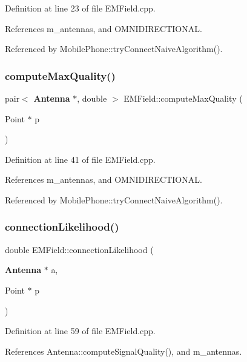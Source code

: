Definition at line 23 of file E\+M\+Field.\+cpp.



References m\+\_\+antennas, and O\+M\+N\+I\+D\+I\+R\+E\+C\+T\+I\+O\+N\+AL.



Referenced by Mobile\+Phone\+::try\+Connect\+Naive\+Algorithm().

\mbox{\label{class_e_m_field_ae51a157793b6d59c314b14f3c0b1795c}} 
\subsubsection{compute\+Max\+Quality()}
{\footnotesize\ttfamily pair$<$ \textbf{ Antenna} $\ast$, double $>$ E\+M\+Field\+::compute\+Max\+Quality (\begin{DoxyParamCaption}\item[{Point $\ast$}]{p }\end{DoxyParamCaption})}



Definition at line 41 of file E\+M\+Field.\+cpp.



References m\+\_\+antennas, and O\+M\+N\+I\+D\+I\+R\+E\+C\+T\+I\+O\+N\+AL.



Referenced by Mobile\+Phone\+::try\+Connect\+Naive\+Algorithm().

\mbox{\label{class_e_m_field_abe54bab01ef42cc8b32d6f76b4ccf7a2}} 
\subsubsection{connection\+Likelihood()}
{\footnotesize\ttfamily double E\+M\+Field\+::connection\+Likelihood (\begin{DoxyParamCaption}\item[{\textbf{ Antenna} $\ast$}]{a,  }\item[{Point $\ast$}]{p }\end{DoxyParamCaption})}



Definition at line 59 of file E\+M\+Field.\+cpp.



References Antenna\+::compute\+Signal\+Quality(), and m\+\_\+antennas.



